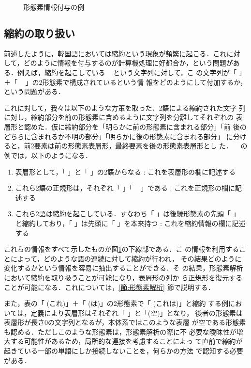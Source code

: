\begin{figure}
\begin{boxit}
\end{boxit}
\caption{形態素情報付与の例}
\label{図:タグ付与}
\end{figure}

\subsection{縮約の取り扱い}

前述したように，韓国語においては縮約という現象が頻繁に起こる．これに対
して，どのように情報を付与するのが計算機処理に好都合か，という問題があ
る．例えば，縮約を起こしている
\verb*| |
 という文字列に対して，こ
の文字列が「
」＋「
\verb*| |
」の2形態素で構成されているという情
報をどのようにして付加するか，という問題がある．

これに対して，我々は以下のような方策を取った．2語による縮約された文字
列に対し，縮約部分を前の形態素に含めるように文字列を分離してそれぞれの
表層形と認めた．仮に縮約部分を「明らかに前の形態素に含まれる部分」「前
後のどちらに含まれるか不明の部分」「明らかに後の形態素に含まれる部分」
に分けると，前2要素は前の形態素表層形，最終要素を後の形態素表層形とし
た．
\verb*| |
の例では，以下のようになる．

\begin{enumerate}
\item
表層形として，「
」と「
」の2語からなる
: これを表層形の欄に記述する
\item
これら2語の正規形は，それぞれ「
」「
\verb*| |
」である
: これを正規形の欄に記述する
\item 
これら2語は縮約を起こしている．すなわち「
」は後続形態素の先頭「
」
と縮約しており，「
」は先頭に「
」を本来持つ
: これを縮約情報の欄に記述する
\end{enumerate}

これらの情報をすべて示したものが図\ref{図:タグ付与}の下線部である．こ
の情報を利用することによって，どのような語の連続に対して縮約が行われ，
その結果どのように変化するかという情報を容易に抽出することができる．そ
の結果，形態素解析において縮約を取り扱うことが可能になり，表層形の列か
ら正規形を復元することが可能になる．これについては，\ref{節:形態素解析}
節で説明する．

また，表の「
(これ)」＋「
(は)」の2形態素で「
(これは)」と縮約
する例においては，定義により表層形はそれぞれ「
」と「(空)」となり，
後者の形態素は表層形が長さ0の文字列となるが，本体系ではこのような表層
が空である形態素も認める．ただしこのような形態素は，形態素解析の際に不
必要な曖昧性が増大する可能性があるため，局所的な連接を考慮することによっ
て直前で縮約が起きている一部の単語にしか接続しないことを，何らかの方法
で認知する必要がある．



